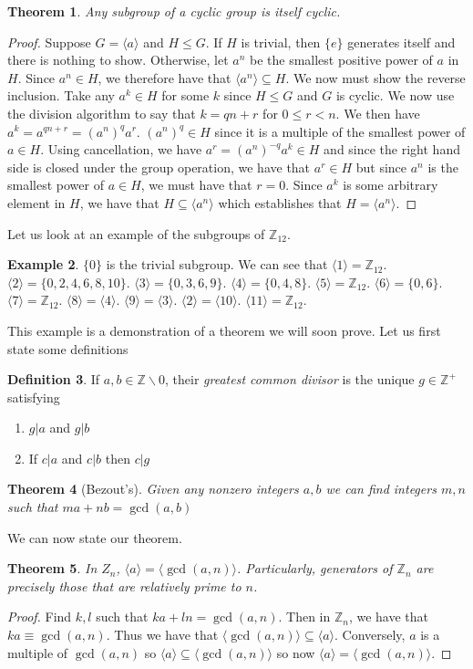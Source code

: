 \documentclass{article}
\newcommand{\Z}{\mathbb{Z}}
\newtheorem{theorem}{Theorem}[section]
\theoremstyle{definition}
\newtheorem{definition}[theorem]{Definition}
\newtheorem{example}[theorem]{Example}
\begin{document}
\begin{theorem}
    Any subgroup of a cyclic group is itself cyclic.
\end{theorem}
\begin{proof}
    Suppose $G=\langle a\rangle$ and $H\leq G$. If $H$ is trivial, then $\{e\}$ generates itself and there is nothing to show. Otherwise, let $a^n$ be the smallest positive power of $a$ in $H$. Since $a^n\in H$, we therefore have that $\langle a^n \rangle \subseteq H$. We now must show the reverse inclusion. Take any $a^k \in H$ for some $k$ since $H\leq G$ and $G$ is cyclic. We now use the division algorithm to say that $k=qn+r$ for $0\leq  r<n$. We then have $a^k = a^{qn+r}=(a^n)^qa^r$. $(a^n)^q\in H$ since it is a multiple of the smallest power of $a\in H$. Using cancellation, we have $a^r=(a^n)^{-q}a^k\in H$ and since the right hand side is closed under the group operation, we have that $a^r\in H$ but since $a^n$ is the smallest power of $a\in H$, we must have that $r=0$. Since $a^k$ is some arbitrary element in $H$, we have that $H\subseteq \langle a^n\rangle$ which establishes that $H=\langle a^n\rangle$.
\end{proof}
Let us look at an example of the subgroups of $\Z_{12}$. 
\begin{example}
    $\{0\}$ is the trivial subgroup. We can see that $\langle 1 \rangle =\Z_{12}$. $\langle 2 \rangle = \{ 0,2,4,6,8,10\}$. $\langle 3\rangle = \{0,3,6,9\}$. $\langle 4 \rangle =\{0,4,8\}$. $\langle 5\rangle =\Z_{12}$. $\langle 6 \rangle =\{0,6\}$. $\langle 7\rangle = \Z_{12}$. $\langle 8\rangle =\langle 4\rangle$. $\langle 9\rangle =\langle 3\rangle$. $\langle 2\rangle =\langle 10\rangle$. $\langle 11\rangle =\Z_{12}$. 
\end{example}
This example is a demonstration of a theorem we will soon prove. Let us first state some definitions
\begin{definition}
    If $a,b\in \Z \backslash 0$, their \emph{greatest common divisor} is the unique $g\in \Z^+$ satisfying 
    \begin{enumerate}
        \item $g|a$ and $g|b$
        \item If $c|a$ and $c|b$ then $c|g$
    \end{enumerate}
\end{definition}
\begin{theorem}[Bezout's]
    Given any nonzero integers $a,b$ we can find integers $m,n$ such that $ma+nb=\gcd (a,b)$
\end{theorem}
We can now state our theorem.
\begin{theorem}
    In $Z_n$, $\langle a \rangle=\langle \gcd(a,n)\rangle$. Particularly, generators of $\Z_n$ are precisely those that are relatively prime to $n$.
\end{theorem}
\begin{proof}
    Find $k,l$ such that $ka+ln =\gcd(a,n)$. Then in $\Z_n$, we have that $ka \equiv \gcd(a,n)$. Thus we have that $\langle \gcd(a,n)\rangle \subseteq \langle a \rangle$. Conversely, $a$ is a multiple of $\gcd(a,n)$ so $\langle a \rangle \subseteq \langle \gcd(a,n)\rangle$ so now $\langle a \rangle = \langle \gcd(a,n)\rangle$.
\end{proof}
\end{document}
